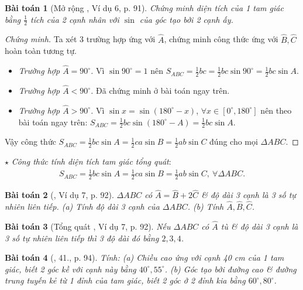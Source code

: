 \documentclass{article}
\newtheorem{baitoan}{Bài toán}
\begin{document}
\begin{baitoan}[Mở rộng \cite{Binh_Toan_9_tap_1}, Ví dụ 6, p. 91]
	Chứng minh diện tích của 1 tam giác bằng $\frac{1}{2}$ tích của 2 cạnh nhân với $\sin$ của góc tạo bởi 2 cạnh ấy.
\end{baitoan}

\begin{proof}[Chứng minh]
	Ta xét 3 trường hợp ứng với $\widehat{A}$, chứng minh công thức ứng với $\widehat{B},\widehat{C}$ hoàn toàn tương tự.
	\begin{itemize}
		\item \textit{Trường hợp $\widehat{A} = 90^\circ$.} Vì $\sin90^\circ = 1$ nên $S_{ABC} = \frac{1}{2}bc = \frac{1}{2}bc\sin90^\circ = \frac{1}{2}bc\sin A$.
		\item \textit{Trường hợp $\widehat{A} < 90^\circ$.} Đã chứng minh ở bài toán ngay trên.
		\item \textit{Trường hợp $\widehat{A} > 90^\circ$.} Vì $\sin x = \sin(180^\circ - x)$, $\forall x\in[0^\circ,180^\circ]$ nên theo bài toán ngay trên: $S_{ABC} = \frac{1}{2}bc\sin(180^\circ - A) = \frac{1}{2}bc\sin A$.
	\end{itemize}
	Vậy công thức $S_{ABC} = \frac{1}{2}bc\sin A = \frac{1}{2}ca\sin B = \frac{1}{2}ab\sin C$ đúng cho mọi $\Delta ABC$.
\end{proof}
\noindent$\star$ \textit{Công thức tính diện tích tam giác tổng quát}:
\begin{align*}
	\boxed{S_{ABC} = \frac{1}{2}bc\sin A = \frac{1}{2}ca\sin B = \frac{1}{2}ab\sin C,\ \forall\Delta ABC.}
\end{align*}

\begin{baitoan}[\cite{Binh_Toan_9_tap_1}, Ví dụ 7, p. 92]
	$\Delta ABC$ có $\widehat{A} = \widehat{B} + 2\widehat{C}$ \& độ dài 3 cạnh là 3 số tự nhiên liên tiếp. (a) Tính độ dài 3 cạnh của $\Delta ABC$. (b) Tính $\widehat{A},\widehat{B},\widehat{C}$.
\end{baitoan}

\begin{baitoan}[Tổng quát \cite{Binh_Toan_9_tap_1}, Ví dụ 7, p. 92]
	Nếu $\Delta ABC$ có $\widehat{A}$ tù \& độ dài 3 cạnh là 3 số tự nhiên liên tiếp thì 3 độ dài đó bằng $2,3,4$.
\end{baitoan}

\begin{baitoan}[\cite{Binh_Toan_9_tap_1}, 41., p. 94]
	Tính: (a) Chiều cao ứng với cạnh {\rm40 cm} của 1 tam giác, biết 2 góc kề với cạnh này bằng $40^\circ,55^\circ$. (b) Góc tạo bởi đường cao \& đường trung tuyến kẻ từ 1 đỉnh của tam giác, biết 2 góc ở 2 đỉnh kia bằng $60^\circ,80^\circ$.
\end{baitoan}
\end{document}
